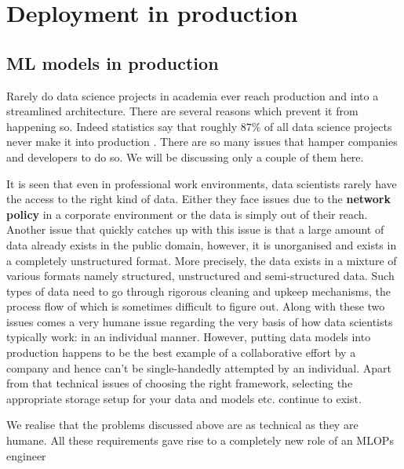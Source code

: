\chapter{Deployment in production} \label{chapter4}

\section{ML models in production}


Rarely do data science projects in academia ever reach production and into a streamlined architecture. There are several reasons which prevent it from happening so. Indeed statistics say that roughly $87\%$ of all data science projects never make it into production \cite{vb2019}.  There are so many issues that hamper companies and developers to do so. We will be discussing only a couple of them here. \par

It is seen that even in professional work environments, data scientists rarely have the access to the right kind of data. Either they face issues due to the \textbf{network policy} in a corporate environment or the data is simply out of their reach. Another issue that quickly catches up with this issue is that a large amount of data already exists in the public domain, however, it is unorganised and exists in a completely unstructured format. More precisely, the data exists in a mixture of various formats namely structured, unstructured and semi-structured data. Such types of data need to go through rigorous cleaning and upkeep mechanisms, the process flow of which is sometimes difficult to figure out. Along with these two issues comes a very humane issue regarding the very basis of how data scientists typically work: in an individual manner. However, putting data models into production happens to be the best example of a collaborative effort by a company and hence can’t be single-handedly attempted by an individual. Apart from that technical issues of choosing the right framework, selecting the appropriate storage setup for your data and models etc. continue to exist.\par

We realise that the problems discussed above are as technical as they are humane. All these requirements gave rise to a completely new role of an MLOPs engineer \cite{Odegua2020}

